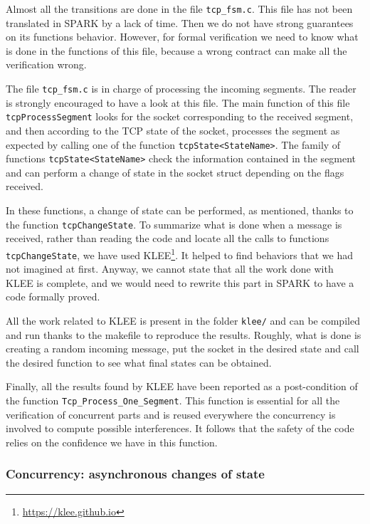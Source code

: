 \documentclass[a4paper, 10pt]{article}
\begin{document}
    Almost all the transitions are done in the file \texttt{tcp\_fsm.c}. This file has not been
    translated in SPARK by a lack of time. Then we do not have strong guarantees on its functions
    behavior. However, for formal verification we need to know what is done in the functions of
    this file, because a wrong contract can make all the verification wrong.

    The file \texttt{tcp\_fsm.c} is in charge of processing the incoming segments. The reader is
    strongly encouraged to have a look at this file. The main function of this file
    \texttt{tcpProcessSegment} looks for the socket corresponding to the received segment, and then
    according to the TCP state of the socket, processes the segment as expected by calling one of
    the function \texttt{tcpState<StateName>}. The family of functions \texttt{tcpState<StateName>}
    check the information contained in the segment and can perform a change of state in the socket
    struct depending on the flags received.

    In these functions, a change of state can be performed, as mentioned, thanks to the function
    \texttt{tcpChangeState}. To summarize what is done when a message is received, rather than
    reading the code and locate all the calls to functions \texttt{tcpChangeState}, we have used
    KLEE\footnote{\url{https://klee.github.io}}. It helped to find behaviors that we had not 
    imagined at first. Anyway, we cannot state that all the work done with KLEE is complete, and
    we would need to rewrite this part in SPARK to have a code formally proved.

    All the work related to KLEE is present in the folder \texttt{klee/} and can be compiled and run
    thanks to the makefile to reproduce the results. Roughly, what is done is creating a random
    incoming message, put the socket in the desired state and call the desired function to see what
    final states can be obtained.

    Finally, all the results found by KLEE have been reported as a post-condition of the function
    \lstinline[language=Ada]{Tcp_Process_One_Segment}.
    This function is essential for all the verification of concurrent parts and is reused everywhere
    the concurrency is involved to compute possible interferences. It follows that the safety of the code
    relies on the confidence we have in this function.

    \subsubsection{Concurrency: asynchronous changes of state}
    \label{section:asynchronous}
\end{document}
